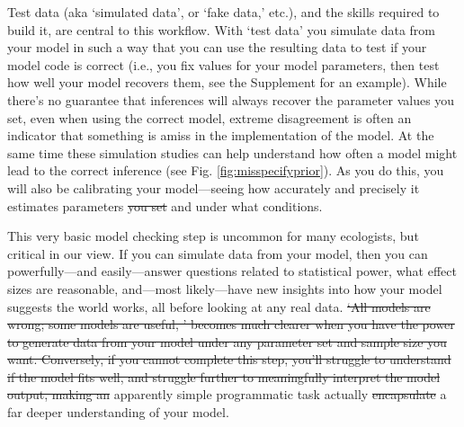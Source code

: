 \documentclass[11pt]{article}
\providecommand{\DIFaddtex}[1]{{\protect\color{blue}\uwave{#1}}} %
\providecommand{\DIFdeltex}[1]{{\protect\color{red}\sout{#1}}}                      %
\providecommand{\DIFaddbegin}{} %
\providecommand{\DIFaddend}{} %
\providecommand{\DIFdelbegin}{} %
\providecommand{\DIFdelend}{} %
\providecommand{\DIFadd}[1]{\texorpdfstring{\DIFaddtex{#1}}{#1}} %
\providecommand{\DIFdel}[1]{\texorpdfstring{\DIFdeltex{#1}}{}} %
\newcommand{\DIFscaledelfig}{0.5}
\newlength{\DIFdelgraphicswidth} %
\newlength{\DIFdelgraphicsheight} %
\newcommand{\DIFaddincludegraphics}[2][]{{\color{blue}\fbox{\DIFOincludegraphics[#1]{#2}}}} %
\newcommand{\DIFdelincludegraphics}[2][]{%
\sbox{\DIFdelgraphicsbox}{\DIFOincludegraphics[#1]{#2}}%
\settoboxwidth{\DIFdelgraphicswidth}{\DIFdelgraphicsbox} %
\settoboxtotalheight{\DIFdelgraphicsheight}{\DIFdelgraphicsbox} %
\scalebox{\DIFscaledelfig}{%
\parbox[b]{\DIFdelgraphicswidth}{\usebox{\DIFdelgraphicsbox}\\[-\baselineskip] \rule{\DIFdelgraphicswidth}{0em}}\llap{\resizebox{\DIFdelgraphicswidth}{\DIFdelgraphicsheight}{%
\setlength{\unitlength}{\DIFdelgraphicswidth}%
\begin{picture}(1,1)%
\thicklines\linethickness{2pt} %
{\color[rgb]{1,0,0}\put(0,0){\framebox(1,1){}}}%
{\color[rgb]{1,0,0}\put(0,0){\line( 1,1){1}}}%
{\color[rgb]{1,0,0}\put(0,1){\line(1,-1){1}}}%
\end{picture}%
}\hspace*{3pt}}} %
} %
\DeclareRobustCommand{\DIFaddbegin}{\DIFOaddbegin \let\includegraphics\DIFaddincludegraphics} %
\DeclareRobustCommand{\DIFaddend}{\DIFOaddend \let\includegraphics\DIFOincludegraphics} %
\DeclareRobustCommand{\DIFdelbegin}{\DIFOdelbegin \let\includegraphics\DIFdelincludegraphics} %
\DeclareRobustCommand{\DIFdelend}{\DIFOaddend \let\includegraphics\DIFOincludegraphics} %
\begin{document}
Test data (aka `simulated data', or  `fake data,' etc.), and the skills required to build it, are central to this workflow. With `test data' you simulate data from your model in such a way that you can use the resulting data to test if your model code is correct (i.e., you fix values for your model parameters, then test how well your model recovers them, see the Supplement for an example). While there's no guarantee that inferences will always recover the parameter values you set, even when using the correct model, extreme disagreement is often an indicator that something is amiss in the implementation of the model. At the same time these simulation studies can help understand how often a model might lead to the correct inference (see Fig. \ref{fig:misspecifyprior}). As you do this, you will also be calibrating your model---seeing how accurately and precisely it estimates parameters \DIFdelbegin \DIFdel{you set }\DIFdelend and under what conditions. 

This very basic model checking step is uncommon for many ecologists, but critical in our view. If you can simulate data from your model, then you can powerfully---and easily---answer questions related to statistical power, what effect sizes are reasonable, and---most likely---have new insights into how your model suggests the world works, all before looking at any real data. \DIFdelbegin \DIFdel{`All models are wrong; some models are useful, ' becomes much clearer when you have the power to generate data from your model under any parameter set and sample size you want. Conversely, if you cannot complete this step, you'll struggle to understand if the model fits well, and struggle further to meaningfully interpret the model output, making an }\DIFdelend \DIFaddbegin \DIFadd{Thus, this }\DIFaddend apparently simple programmatic task actually \DIFdelbegin \DIFdel{encapsulate }\DIFdelend \DIFaddbegin \DIFadd{encapsulates }\DIFaddend a far deeper understanding of your model. %
\end{document}
